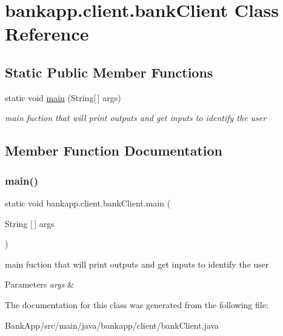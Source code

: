 \hypertarget{classbankapp_1_1client_1_1bankClient}{}\section{bankapp.\+client.\+bank\+Client Class Reference}
\label{classbankapp_1_1client_1_1bankClient}
\subsection*{Static Public Member Functions}
\begin{DoxyCompactItemize}
\item 
static void \hyperlink{classbankapp_1_1client_1_1bankClient_ad22392d35ad10f91cc417f169b69ff7b}{main} (String\mbox{[}$\,$\mbox{]} args)
\begin{DoxyCompactList}\small\item\em main fuction that will print outputs and get inputs to identify the user \end{DoxyCompactList}\end{DoxyCompactItemize}


\subsection{Member Function Documentation}
\mbox{\label{classbankapp_1_1client_1_1bankClient_ad22392d35ad10f91cc417f169b69ff7b}} 
\subsubsection{\texorpdfstring{main()}{main()}}
{\footnotesize\ttfamily static void bankapp.\+client.\+bank\+Client.\+main (\begin{DoxyParamCaption}\item[{String \mbox{[}$\,$\mbox{]}}]{args }\end{DoxyParamCaption})\hspace{0.3cm}{\ttfamily [static]}}



main fuction that will print outputs and get inputs to identify the user 


\begin{DoxyParams}{Parameters}
{\em args} & \\
\hline
\end{DoxyParams}


The documentation for this class was generated from the following file\+:\begin{DoxyCompactItemize}
\item 
Bank\+App/src/main/java/bankapp/client/bank\+Client.\+java\end{DoxyCompactItemize}
